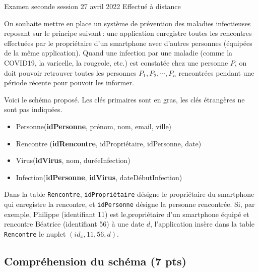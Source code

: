 %
{Examen seconde session 27 avril 2022}%
{Effectué à distance}%


On souhaite mettre en place un système de prévention des maladies infectieuses
reposant sur le principe suivant\,: une application  
enregistre toutes les rencontres effectuées par le propriétaire
d'un smartphone avec d'autres personnes (équipées de la même application). 
Quand une infection par une maladie (comme la COVID19, la  varicelle, la rougeole, etc.)
est constatée chez une personne $P$, on doit pouvoir retrouver toutes  les
personnes $P_1, P_2, \cdots, P_n$ rencontrées pendant une période récente pour pouvoir
les informer.

Voici le schéma proposé. Les clés primaires sont en gras, les clés étrangères ne sont pas indiquées.

\begin{itemize}
\item Personne(\textbf{idPersonne},  prénom, nom, email, ville)
\item Rencontre (\textbf{idRencontre}, idPropriétaire, idPersonne, date)
\item Virus(\textbf{idVirus}, nom, duréeInfection)
\item Infection(\textbf{idPersonne}, \textbf{idVirus}, dateDébutInfection)
\end{itemize}

Dans la table \texttt{Rencontre}, \texttt{idPropriétaire} désigne le propriétaire
du smartphone qui enregistre la rencontre, et  \texttt{idPersonne} désigne
la personne rencontrée. Si, par exemple, Philippe (identifiant 11) est le,propriétaire
d'un smartphone équipé et rencontre Béatrice
(identifiant 56) à une date $d$, 
l'application insère dans la table 
\texttt{Rencontre} le nuplet 
$(id_x, 11, 56, d)$.  

\subsection*{Compréhension du schéma (7 pts)}

